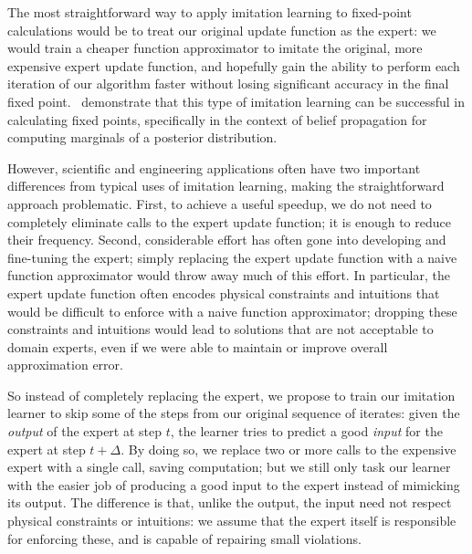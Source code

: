 \documentclass[twoside,11pt]{article}
\begin{document}
The most straightforward way to apply imitation learning to fixed-point calculations would be to treat our original update function as the expert: we would train a cheaper function approximator to imitate the original, more expensive expert update function, and hopefully gain the ability to perform each iteration of our algorithm faster without losing significant accuracy in the final fixed point.~\citep{rossBP} demonstrate that this type of imitation learning can be successful in calculating fixed points, specifically in the context of belief propagation for computing marginals of a posterior distribution.

However, scientific and engineering applications often have two important differences from typical uses of imitation learning, making the straightforward approach problematic.  First, to achieve a useful speedup, we do not need to completely eliminate calls to the expert update function; it is enough to reduce their frequency.  Second, considerable effort has often gone into developing and fine-tuning the expert; simply replacing the expert update function with a naive function approximator would throw away much of this effort.  In particular, the expert update function often encodes physical constraints and intuitions that would be difficult to enforce with a naive function approximator; dropping these constraints and intuitions would lead to solutions that are not acceptable to domain experts, even if we were able to maintain or improve overall approximation error.

So instead of completely replacing the expert, we propose to train our imitation learner to skip some of the steps from our original sequence of iterates: given the \emph{output} of the expert at step $t$, the learner tries to predict a good \emph{input} for the expert at step $t+\Delta$.  By doing so, we replace two or more calls to the expensive expert with a single call, saving computation; but we still only task our learner with the easier job of producing a good input to the expert instead of mimicking its output.  The difference is that, unlike the output, the input need not respect physical constraints or intuitions: we assume that the expert itself is responsible for enforcing these, and is capable of repairing small violations.

\end{document}
